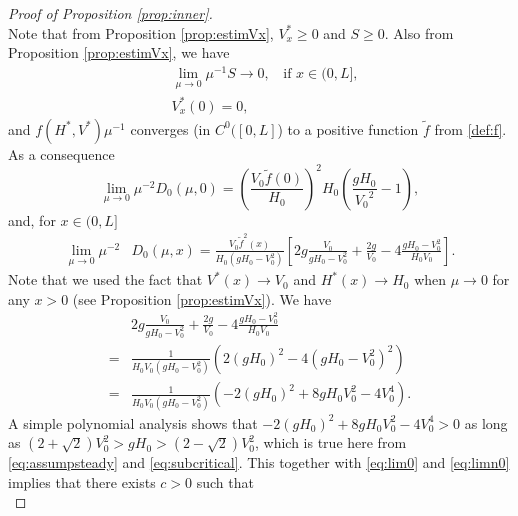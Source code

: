 \documentclass[11pt]{article}
\begin{document}
\begin{proof}[Proof of Proposition \ref{prop:inner}]
\begin{equation}
\end{equation}
\normalsize
Note that from Proposition \ref{prop:estimVx}, $V_{x}^{*}\geq 0$ and $S\geq 0$.
Also from Proposition \ref{prop:estimVx}, we have
\begin{equation}
    \begin{split}
    &\lim\limits_{\mu\rightarrow 0}\mu^{-1}S\rightarrow 0,\;\;\text{ if }x\in(0,L],\\
    &V_{x}^*(0) = 0,
    \end{split}
\end{equation}
and $f({H^{*}},{V^{*}})\mu^{-1}$ converges (in $C^{0}([0,L]$) to a positive function $\tilde{f}$ from \eqref{def:f}. As a consequence
\begin{equation}
\label{eq:lim0}
    \lim\limits_{\mu\rightarrow 0}\mu^{-2} D_{0}(\mu,0)= \left(\frac{V_{0}\tilde{f}(0)}{H_{0}}\right)^{2}H_{0}\left(\frac{gH_{0}}{{V_{0}}^{2}}-1\right),
\end{equation}
and, for $x\in(0,L]$
\begin{equation}
\label{eq:limn0}
\begin{split}
    \lim\limits_{\mu\rightarrow 0}\mu^{-2} &D_{0}(\mu,x)= \frac{V_{0}\tilde{f}^{2}(x)}{H_{0}(gH_{0}-V_{0}^{2})}
    \left[
    2g\frac{V_{0}}{gH_{0}-V^{2}_{0}}+\frac{2g}{V_{0}}-4\frac{gH_{0}-V_{0}^{2}}{H_{0}V_{0}}
    \right].
    \end{split}
\end{equation}
{Note that we used the fact that $V^{*}(x)\rightarrow V_{0}$ and $H^{*}(x)\rightarrow H_{0}$ when $\mu\rightarrow 0$ for any $x>0$ (see Proposition \ref{prop:estimVx}).}
{
We have
\begin{equation}
\begin{split}
        &2g\frac{V_{0}}{gH_{0}-V^{2}_{0}}+\frac{2g}{V_{0}}-4\frac{gH_{0}-V_{0}^{2}}{H_{0}V_{0}}\\
        =&\frac{1}{H_{0}V_{0}(gH_{0}-V^{2}_{0})}\left(2(gH_{0})^{2}-4(gH_{0}-V_{0}^{2})^{2}\right)\\
        =&\frac{1}{H_{0}V_{0}(gH_{0}-V^{2}_{0})}\left(-2(gH_{0})^{2}+8gH_{0}V_{0}^{2}-4 V_{0}^{4}\right).
        \end{split}
\end{equation}
A simple polynomial analysis shows that $-2(gH_{0})^{2}+8gH_{0}V_{0}^{2}-4V_{0}^{4}>0$ as long as $(2+\sqrt{2})V_{0}^{2}>gH_{0}>(2-\sqrt{2})V_{0}^{2}$, which is true here from \eqref{eq:assumpsteady} and \eqref{eq:subcritical}. This together with \eqref{eq:lim0} and \eqref{eq:limn0} implies that there exists $c>0$ such that
\begin{equation}

\end{equation}}
\end{proof}
\end{document}
